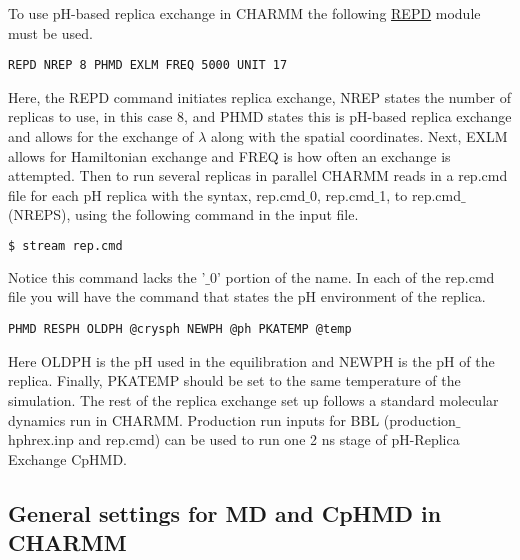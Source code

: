 To use pH-based replica exchange in CHARMM the following \href{https://hpc.nih.gov/apps/charmm/c39b2html/repdstr.html}{REPD} module must be used.
%
\begin{lstlisting}
REPD NREP 8 PHMD EXLM FREQ 5000 UNIT 17
\end{lstlisting}
%
Here, the REPD command initiates replica exchange, NREP states the number of replicas to use, in this case 8, and PHMD states this is pH-based replica exchange and allows for the exchange of $\lambda$ along with the spatial coordinates.
Next, EXLM allows for Hamiltonian exchange and FREQ is how often an exchange is attempted. 
Then to run several replicas in parallel CHARMM reads in a rep.cmd file for each pH replica with the syntax, rep.cmd$\_$0, rep.cmd$\_$1, to rep.cmd$\_$(NREPS), using the following command in the input file.
%
\begin{lstlisting}[language=bash]
$ stream rep.cmd
\end{lstlisting}
% 
Notice this command lacks the '$\_0$' portion of the name.
In each of the rep.cmd file you will have the command that states the pH environment of the replica.
%
\begin{lstlisting}
PHMD RESPH OLDPH @crysph NEWPH @ph PKATEMP @temp
\end{lstlisting}
%
Here OLDPH is the pH used in the equilibration and NEWPH is the pH of the replica.
Finally, PKATEMP should be set to the same temperature of the simulation. 
The rest of the replica exchange set up follows a standard molecular dynamics run in CHARMM.
Production run inputs for BBL (production$\_$hphrex.inp and rep.cmd) can be used to run one 2 ns stage of pH-Replica Exchange CpHMD.

\subsection{General settings for MD and CpHMD in CHARMM}

